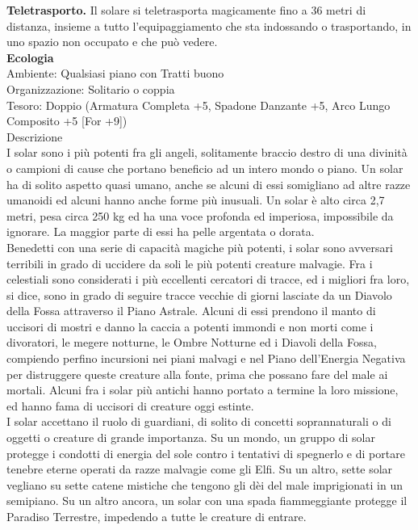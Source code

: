 \begin{multicols}{2}
\textbf{Teletrasporto.} Il solare si teletrasporta magicamente fino a 36 metri di distanza, insieme a tutto l'equipaggiamento che sta indossando o trasportando, in uno spazio non occupato e che può vedere.\\
\textbf{Ecologia}\\
Ambiente: Qualsiasi piano con Tratti buono\\
Organizzazione: Solitario o coppia\\
Tesoro: Doppio (Armatura Completa +5, Spadone Danzante +5, Arco Lungo Composito +5 [For +9])\\
Descrizione\\
I solar sono i più potenti fra gli angeli, solitamente braccio destro di una divinità o campioni di cause che portano beneficio ad un intero mondo o piano. Un solar ha di solito aspetto quasi umano, anche se alcuni di essi somigliano ad altre razze umanoidi ed alcuni hanno anche forme più inusuali. Un solar è alto circa 2,7 metri, pesa circa 250 kg ed ha una voce profonda ed imperiosa, impossibile da ignorare. La maggior parte di essi ha pelle argentata o dorata.\\
Benedetti con una serie di capacità magiche più potenti, i solar sono avversari terribili in grado di uccidere da soli le più potenti creature malvagie. Fra i celestiali sono considerati i più eccellenti cercatori di tracce, ed i migliori fra loro, si dice, sono in grado di seguire tracce vecchie di giorni lasciate da un Diavolo della Fossa attraverso il Piano Astrale. Alcuni di essi prendono il manto di uccisori di mostri e danno la caccia a potenti immondi e non morti come i divoratori, le megere notturne, le Ombre Notturne ed i Diavoli della Fossa, compiendo perfino incursioni nei piani  malvagi e nel Piano dell'Energia Negativa per distruggere queste creature alla fonte, prima che possano fare del male ai mortali. Alcuni fra i solar più antichi hanno portato a termine la loro missione, ed hanno fama di uccisori di creature oggi estinte.\\
I solar accettano il ruolo di guardiani, di solito di concetti soprannaturali o di oggetti o creature di grande importanza. Su un mondo, un gruppo di solar protegge i condotti di energia del sole contro i tentativi di spegnerlo e di portare tenebre eterne operati da razze malvagie come gli Elfi. Su un altro, sette solar vegliano su sette catene mistiche che tengono gli dèi del male imprigionati in un semipiano. Su un altro ancora, un solar con una spada fiammeggiante protegge il Paradiso Terrestre, impedendo a tutte le creature di entrare.\\

\end{multicols}
